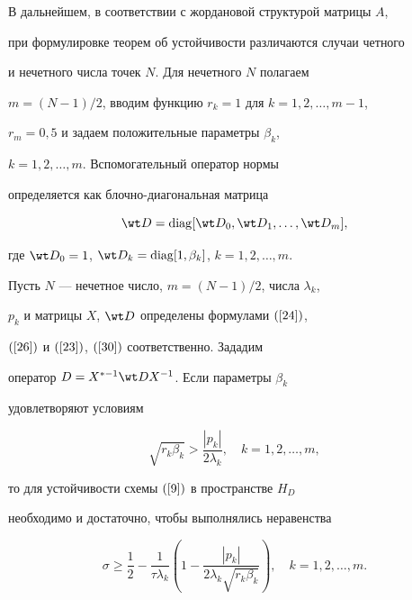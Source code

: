 В дальнейшем, в соответствии с жордановой структурой матрицы $A$,


при формулировке теорем об устойчивости различаются случаи четного


и нечетного числа точек $N$. Для нечетного $N$ полагаем


$m=(N-1)/2$, вводим функцию $r_{k}=1$ для $k=1,2,\dotsc,m-1$,


$r_m=0{,}5$ и задаем положительные параметры $\beta_k$,


$k=1,2,\dotsc,m$. Вспомогательный оператор нормы


определяется как блочно-диагональная матрица


\begin{equation}\label{30}


\wt D=\diag[ {\wt D_0,\wt D_1, \dotsc,\wt D_m}],


\end{equation}


где $\wt D_0=1$, $\wt D_k=\diag[ {1,\beta_k}


]$, $k=1,2,\dotsc,m$.





\begin{thm}\label{theorem2}


Пусть $N$ --- нечетное число, $m=(N-1)/2$, числа $\lambda_k $, 


$p_k$ и матрицы $X$, $\wt D$ определены формулами $(\ref{24})$,


$(\ref{26})$ и $(\ref{23})$, $(\ref{30})$ соответственно. Зададим


оператор $D=X^{*-1} \wt DX^{- 1}$. Если параметры $\beta_k$


удовлетворяют условиям


\begin{equation}\label{31}


\sqrt {r_k \beta_k} > \frac{{| {p_k}|}} {{2\lambda


_k}},\quad k=1,2,\dotsc,m,


\end{equation}


то для устойчивости схемы $(\ref{9})$ в пространстве $H_D $


необходимо и достаточно, чтобы выполнялись неравенства


\begin{equation}\label{32}


\sigma \geqslant \frac{1}{2}- \frac{1}{\tau \lambda_{k}} \left (


1-\frac{|p_{k}|}{2\lambda_{k} \sqrt {r_{k}\beta_{k}}}\right),


\quad k=1,2,\dotsc,m.


\end{equation}


\end{thm}





